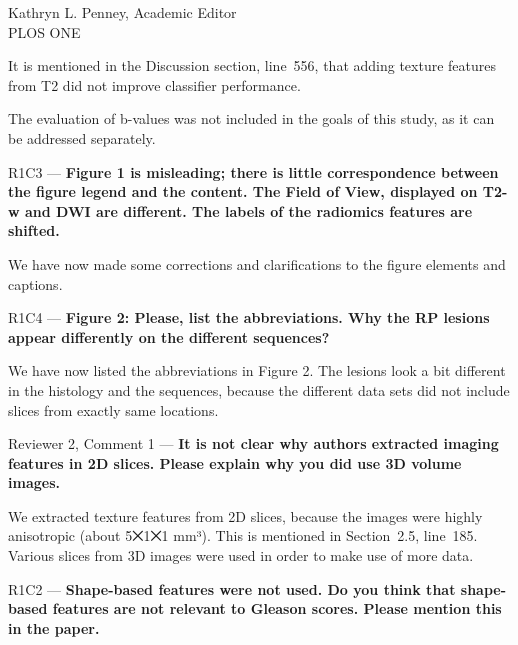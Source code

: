 \documentclass{letter}
\newenvironment{comment}[1]%
  {\vspace{5ex}\par\textsf{#1 ---}\ignorespaces\bfseries}%
  {\par\ignorespacesafterend}
\newenvironment{reply}%
  {\vspace{2ex}\par}%
  {\par\upshape}
\begin{document}
\begin{letter}{Kathryn L. Penney, Academic Editor \\ PLOS ONE}
\begin{reply}
It is mentioned in the Discussion section, line~556, that adding texture
features from T2 did not improve classifier performance.

The evaluation of b-values was not included in the goals of this study, as it
can be addressed separately.
\end{reply}


\begin{comment}{R1C3}
Figure 1 is misleading; there is little correspondence between the figure legend
and the content. The Field of View, displayed on T2-w and DWI are different. The
labels of the radiomics features are shifted.
\end{comment}

\begin{reply}
We have now made some corrections and clarifications to the figure elements and
captions.
\end{reply}


\begin{comment}{R1C4}
Figure 2: Please, list the abbreviations. Why the RP lesions appear differently
on the different sequences?
\end{comment}

\begin{reply}
We have now listed the abbreviations in Figure 2. The lesions look a bit
different in the histology and the sequences, because the different data sets
did not include slices from exactly same locations.
\end{reply}


\begin{comment}{Reviewer 2, Comment 1}
It is not clear why authors extracted imaging features in 2D slices. Please
explain why you did use 3D volume images.
\end{comment}

\begin{reply}
We extracted texture features from 2D slices, because the images were highly
anisotropic (about 5⨉1⨉1 mm³). This is mentioned in Section~2.5, line~185.
Various slices from 3D images were used in order to make use of more data.
\end{reply}


\begin{comment}{R1C2}
Shape-based features were not used. Do you think that shape-based features are
not relevant to Gleason scores. Please mention this in the paper.
\end{comment}


\end{letter}
\end{document}
